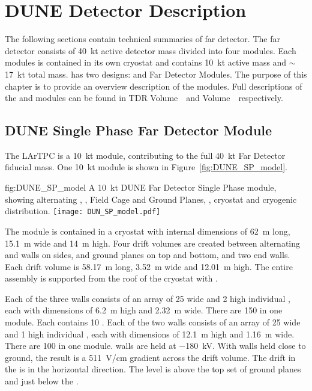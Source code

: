 \chapter{DUNE Detector Description}
\label{vl:tc-dune_overview}


The following sections contain technical summaries of  far
detector. The far detector consists of \SI{40}{\kilo\tonne} active
detector mass divided into four modules. Each modules is contained in
its own cryostat and contains \SI{10}{\kilo\tonne} active mass and
$\sim$\SI{17}{\kilo\tonne} total mass.  has two designs:
 and  Far Detector Modules. The purpose of this
chapter is to provide an overview description of the modules. Full
descriptions of the  and  modules can be found
in TDR  Volume~\volnumbersp\ and  Volume~\volnumberdp\ respectively.

\section{DUNE Single Phase Far Detector Module}
\label{sec:fdsp-SP-module}

The  LArTPC is a \SI{10}{\kilo\tonne} module,
contributing to the full \SI{40}{\kilo\tonne} Far Detector fiducial
mass.  One \SI{10}{\kilo\tonne}  module is shown in
Figure~\ref{fig:DUNE_SP_model}.
\begin{dunefigure}{fig:DUNE_SP_model} {A \SI{10}{\kilo\tonne} DUNE Far Detector
    Single Phase module, showing alternating ,
    , Field Cage and Ground Planes, , cryostat
    and cryogenic distribution.}
  \texttt{[image: DUN\_SP\_model.pdf]}
\end{dunefigure} 

The module is contained in a cryostat with
internal dimensions of \SI{62}{\meter} long, \SI{15.1}{\meter} wide
and \SI{14}{\meter} high.  Four drift volumes are created between
alternating  and  walls on sides,  and
ground planes on top and bottom, and two end walls.  Each drift volume
is \SI{58.17}{\meter} long, \SI{3.52}{\meter} wide and
\SI{12.01}{\meter} high.  The entire assembly is supported from the
roof of the cryostat with .

Each of the three  walls consists of an array of \num{25}
wide and \num{2} high individual , each with dimensions
of \SI{6.2}{\meter} high and \SI{2.32}{\meter} wide. There are
\num{150}  in one module. Each  contains
\num{10} . Each of the two  walls consists of an
array of \num{25} wide and \num{1} high individual , each
with dimensions of \SI{12.1}{\meter} high and \SI{1.16}{\meter}
wide. There are \num{100}  in one module.  
walls are held at $-$\SI{180}{\kilo\volt}. With  walls held
close to ground, the result is a \SI{511}{\volt/\centi\meter} gradient
across the drift volume. The drift in the  is in the horizontal 
direction. The  level is above the top set of ground planes and just
below the .

